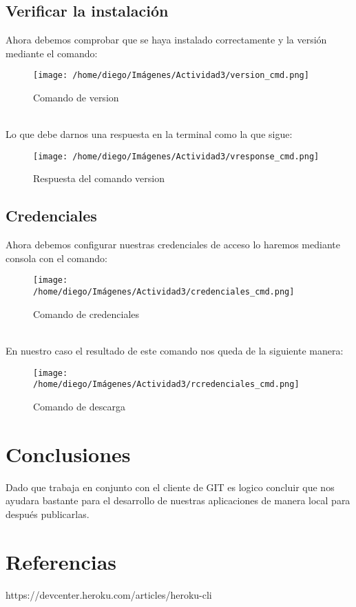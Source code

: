 \documentclass{article}
\begin{document}
		\subsection{Verificar la instalación}
		Ahora debemos comprobar que se haya instalado correctamente y la versión mediante el comando:
		\begin{figure}[h]
			\centering
			\texttt{[image: /home/diego/Imágenes/Actividad3/version\_cmd.png]}
			\caption{Comando de version}
		\end{figure}
		\\Lo que debe darnos una respuesta en la terminal como la que sigue:
		\begin{figure}[h]
			\centering
			\texttt{[image: /home/diego/Imágenes/Actividad3/vresponse\_cmd.png]}
			\caption{Respuesta del comando version}
		\end{figure}
		\subsection{Credenciales}
		Ahora debemos configurar nuestras credenciales de acceso lo haremos mediante consola con el comando:
		\begin{figure}[h]
			\centering
			\texttt{[image: /home/diego/Imágenes/Actividad3/credenciales\_cmd.png]}
			\caption{Comando de credenciales}
		\end{figure}
		\\En nuestro caso el resultado de este comando nos queda de la siguiente manera:
		\begin{figure}[h]
			\centering
			\texttt{[image: /home/diego/Imágenes/Actividad3/rcredenciales\_cmd.png]}
			\caption{Comando de descarga}
		\end{figure}
	\section{Conclusiones}
	Dado que trabaja en conjunto con el cliente de GIT es logico concluir que nos ayudara bastante para el desarrollo de nuestras aplicaciones de manera local para después publicarlas.
	\section{Referencias}
	https://devcenter.heroku.com/articles/heroku-cli
\end{document}
